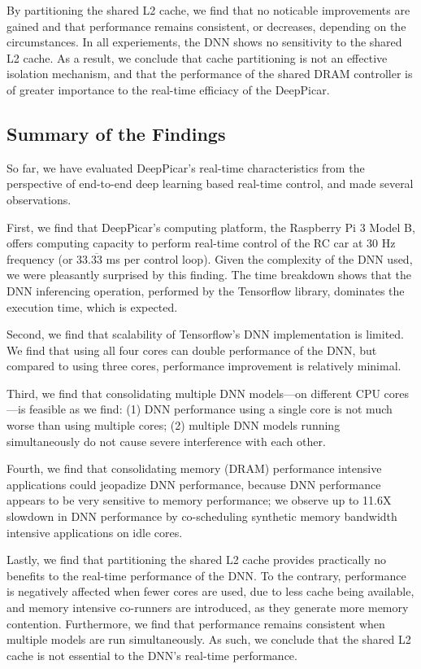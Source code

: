 By partitioning the shared L2 cache, we find that no noticable 
improvements are gained and that performance remains consistent, or 
decreases, depending on the circumstances. In all experiements, the DNN
shows no sensitivity to the shared L2 cache. As a result, we conclude 
that cache partitioning is not an effective isolation mechanism, and that 
the performance of the shared DRAM controller is of greater importance 
to the real-time efficiacy of the DeepPicar.

\subsection{Summary of the Findings}
So far, we have evaluated DeepPicar's real-time
characteristics from the perspective of end-to-end deep learning based
real-time control, and made several observations.

First, we find that DeepPicar's computing platform,
the Raspberry Pi 3 Model B, offers computing capacity to
perform real-time control of the RC car at 30 Hz frequency (or
33.$\overline{\mbox{33}}$ ms  per control loop). Given the complexity of 
the DNN used, we were pleasantly surprised by this finding. 
The time breakdown shows that the DNN inferencing operation, 
performed by the Tensorflow library, dominates the execution time, 
which is expected.

Second, we find that scalability of Tensorflow's DNN 
implementation is limited. We find that using all four cores can double 
performance of the DNN, but compared to using three cores, performance
improvement is relatively minimal.

Third, we find that consolidating multiple DNN models---on different CPU
cores---is feasible as we find: (1) DNN performance using a single
core is not much worse than using multiple cores; (2) multiple DNN
models running simultaneously do not cause severe interference with
each other.

Fourth, we find that consolidating memory (DRAM) performance
intensive applications could jeopadize DNN performance, because DNN
performance appears to be very sensitive to memory performance; we 
observe up to 11.6X slowdown in DNN performance by co-scheduling 
synthetic memory bandwidth intensive applications on idle cores.

Lastly, we find that partitioning the shared L2 cache provides 
practically no benefits to the real-time performance of the DNN. To the 
contrary, performance is negatively affected when fewer cores are used, 
due to less cache being available, and memory intensive co-runners are 
introduced, as they generate more memory contention. Furthermore, we 
find that performance remains consistent when multiple models are run 
simultaneously. As such, we conclude that the shared L2 cache is not 
essential to the DNN's real-time performance.